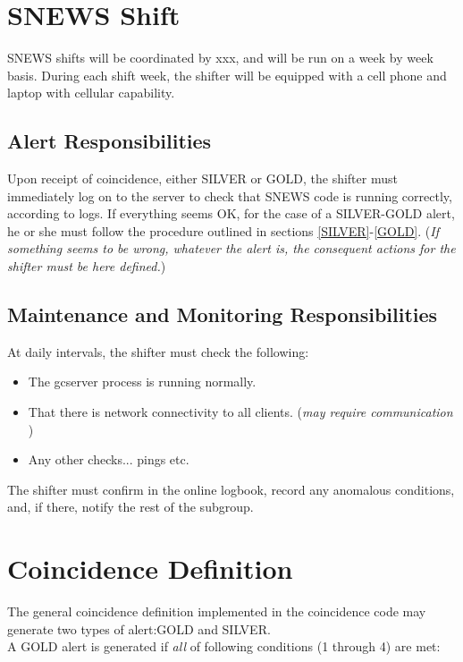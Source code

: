 \documentclass{article}
\begin{document}
\section{SNEWS Shift}

SNEWS shifts will be coordinated by xxx, and will be run on
a week by week basis.  During each shift week, the shifter will
be equipped with a cell phone and laptop with cellular
capability. 

\subsection{Alert Responsibilities}

Upon receipt of coincidence, either SILVER or GOLD, the shifter
must immediately log on to the server to check that SNEWS code is running
correctly, according to logs.  If everything seems OK, for 
the case of a SILVER-GOLD  alert, he or she must follow the procedure
outlined in sections \ref{SILVER}-\ref{GOLD}.
({\it If something seems to be wrong, whatever the alert is, the consequent  
actions for the shifter must be here defined.})

\subsection{Maintenance and Monitoring Responsibilities}

At daily intervals, the shifter must check the following:

\begin{itemize}
\item The gcserver process is running normally.
\item That there is network connectivity to all clients. ({\it may
require communication })
\item Any other checks... pings etc.

\end{itemize}

The shifter must confirm in the online logbook, record any
anomalous conditions, and, if there, notify the rest of the subgroup.



\section{Coincidence Definition}

The general coincidence definition implemented in the coincidence code
may generate two types of alert:GOLD and SILVER.\\
A GOLD alert is generated if {\it all} of
following conditions (1 through 4) are met:
\end{document}
